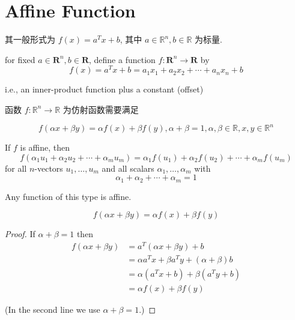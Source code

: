 \section{Affine Function}


\begin{definition}
    其一般形式为 $ f(x)=a^{T} x+{b} $, 其中 $ a \in \mathbb{R}^{n}, b \in \mathbb{R} $ 为标量. 

    
        for fixed $ a \in \mathbf{R}^{n}, b \in \mathbf{R} $, define a function $ f: \mathbf{R}^{n} \rightarrow \mathbf{R} $ by
    $$
    f(x)=a^{T} x+b=a_{1} x_{1}+a_{2} x_{2}+\cdots+a_{n} x_{n}+b
    $$
    
    i.e., an inner-product function plus a constant (offset)
    
\end{definition}

\begin{theorem}
    函数 $ f: \mathbb{R}^{n} \rightarrow \mathbb{R} $ 为仿射函数需要满足

$$ f(\alpha x+\beta y)=\alpha f(x)+\beta f(y), \alpha+\beta=1, \alpha, \beta \in \mathbb{R}, x, y \in \mathbb{R}^{n} $$
\end{theorem}

\begin{corollary}
    If $ f $ is affine, then
$$
f\left(\alpha_{1} u_{1}+\alpha_{2} u_{2}+\cdots+\alpha_{m} u_{m}\right)=\alpha_{1} f\left(u_{1}\right)+\alpha_{2} f\left(u_{2}\right)+\cdots+\alpha_{m} f\left(u_{m}\right)
$$
for all $ n $-vectors $ u_{1}, \ldots, u_{m} $ and all scalars $ \alpha_{1}, \ldots, \alpha_{m} $ with
$$
\alpha_{1}+\alpha_{2}+\cdots+\alpha_{m}=1
$$
\end{corollary}



\begin{theorem}
    Any function of this type is affine.
    
    $$ f(\alpha x+\beta y)=\alpha f(x)+\beta f(y) $$
\end{theorem}

\begin{proof}
    If $ \alpha+\beta=1 $ then
    $$ \begin{aligned} f(\alpha x+\beta y) &=a^{T}(\alpha x+\beta y)+b \\ &=\alpha a^{T} x+\beta a^{T} y+(\alpha+\beta) b \\ &=\alpha\left(a^{T} x+b\right)+\beta\left(a^{T} y+b\right) \\ &=\alpha f(x)+\beta f(y) \end{aligned} $$

    (In the second line we use $\alpha + \beta = 1$.)

\end{proof}

